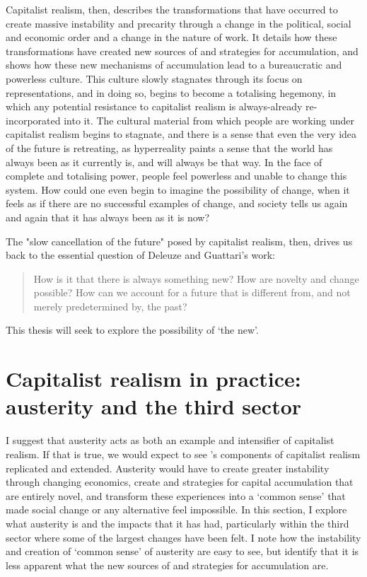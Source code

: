 Capitalist realism, then, describes the transformations that have occurred to create massive instability and precarity through a change in the political, social and economic order and a change in the nature of work. It details how these transformations have created new sources of and strategies for accumulation, and shows how these new mechanisms of accumulation lead to a bureaucratic and powerless culture. This culture slowly stagnates through its focus on representations, and in doing so, begins to become a totalising hegemony, in which any potential resistance to capitalist realism is always-already re-incorporated into it. The cultural material from which people are working under capitalist realism begins to stagnate, and there is a sense that even the very idea of the future is retreating, as hyperreality paints a sense that the world has always been as it currently is, and will always be that way. In the face of complete and totalising power, people feel powerless and unable to change this system. How could one even begin to imagine the possibility of change, when it feels as if there are no successful examples of change, and society tells us again and again that it has always been as it is now? 

The "slow cancellation of the future" \citep[p. 5]{fisher_ghosts_2014} posed by capitalist realism, then, drives us back to the essential question of Deleuze and Guattari's work:
\begin{quote}
How is it that there is always something new? How are novelty and change possible? How can we account for a future that is different from, and not merely predetermined by, the past? \citep[p. 23]{shaviro_deleuzes_2007} 
\end{quote}

This thesis will seek to explore the possibility of `the new'.

\section{Capitalist realism in practice: austerity and the third sector}
\label{sec:capitalist-realism-in-practice-austerity-and-the-third-sector}
I suggest that austerity acts as both an example and intensifier of capitalist realism. If that is true, we would expect to see \citet{shonkwiler_reading_2014}'s components of capitalist realism replicated and extended. Austerity would have to create greater instability through changing economics, create  and strategies for capital accumulation that are entirely novel, and transform these experiences into a `common sense' that made social change or any alternative feel impossible. In this section, I explore what austerity is and the impacts that it has had, particularly within the third sector where some of the largest changes have been felt. I note how the instability and creation of `common sense' of austerity are easy to see, but identify that it is less apparent what the new sources of and strategies for accumulation are.    

